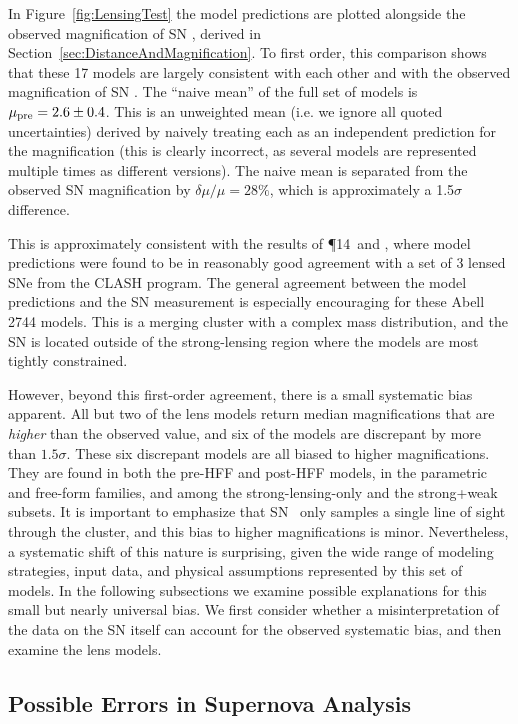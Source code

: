 \medskip
In Figure~\ref{fig:LensingTest} the model predictions are plotted
alongside the observed magnification of SN \tomas, derived in
Section~\ref{sec:DistanceAndMagnification}.  To first order, this
comparison shows that these 17 models are largely consistent with each
other and with the observed magnification of SN \tomas. The
``naive mean'' of the full set of models is $\mu_{\rm pre}=2.6\pm0.4$.
This is an unweighted mean (i.e. we ignore all quoted uncertainties)
derived by naively treating each as an independent
prediction for the magnification (this is clearly incorrect, as
several models are represented multiple times as different versions).
The naive mean is separated from the observed SN magnification by
$\delta\mu/\mu=28\%$, which is approximately a 1.5$\sigma$ difference.

This is approximately consistent with the results
of \P14\ and \citet{Nordin:2014}, where
model predictions were found to be in reasonably good agreement with a
set of 3 lensed SNe from the CLASH program.  The general agreement
between the model predictions and the SN measurement is especially
encouraging for these Abell 2744 models. This is a merging cluster
with a complex mass distribution, and the SN is located
outside of the strong-lensing region where the models are most tightly
constrained.

However, beyond this first-order agreement, there is a small
systematic bias apparent. All but two of the lens models return median
magnifications that are {\it higher} than the observed value, and six
of the models are discrepant by more than $1.5\sigma$. These
six discrepant models are all biased to higher magnifications. They
are found in both the pre-HFF and post-HFF models, in the parametric
and free-form families, and among the strong-lensing-only and the
strong+weak subsets.  It is important to emphasize that SN \tomas\
only samples a single line of sight through the cluster, and this bias
to higher magnifications is minor.  Nevertheless, a systematic shift
of this nature is surprising, given the wide range of modeling
strategies, input data, and physical assumptions represented by this
set of models.  In the following subsections we examine possible
explanations for this small but nearly universal bias.  We first
consider whether a misinterpretation of the data on the SN itself can
account for the observed systematic bias, and then examine the lens
models.

\subsection{Possible Errors in Supernova Analysis}
\label{sec:SupernovaError}

